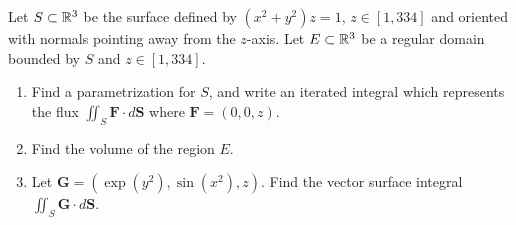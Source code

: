 \documentclass[../hw10]{subfiles}
\begin{document}
\begin{problem}[4]
Let $S\subset \mathbb{R}^3$ be the surface defined by $(x^2 + y^2)z = 1,\, z\in [1,334]$ and oriented with normals pointing away from the $z$-axis.
Let  $E\subset \mathbb{R}^3$ be a regular domain bounded by  $S$ and  $z\in [1,334]$.
\begin{enumerate}[label=(\alph*)]
	\item Find a parametrization for $S$, and write an iterated integral which represents the flux  $\iint_S \mathbf{F}\cdot d\mathbf{S}$ where $\mathbf{F} = (0,0,z)$.
	\item  Find the volume of the region $E$.
	\item Let $\mathbf{G} = (\exp{(y^2)},\sin{(x^2)},z)$.
	      Find the vector surface integral $\iint_S \mathbf{G}\cdot d\mathbf{S}$.
\end{enumerate}
\end{problem}
\end{document}
